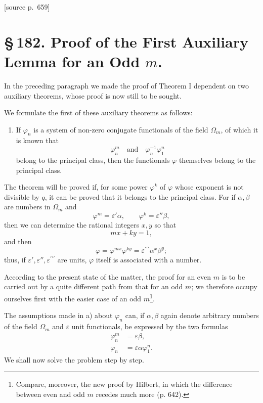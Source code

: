 \documentclass[11pt]{article}
\newcommand{\srcpage}[1]{\par\medskip\noindent\textsf{[source p.~#1]}\par\smallskip}
\begin{document}
\srcpage{659}
\section*{\S\,182. Proof of the First Auxiliary Lemma for an Odd $m$.}

In the preceding paragraph we made the proof of Theorem I dependent on two auxiliary theorems, whose proof is now still to be sought.

We formulate the first of these auxiliary theorems as follows:

\begin{enumerate}[label=\alph*),leftmargin=2.2em]
\item If $\varphi_n$ is a system of non-zero conjugate functionals of the field $\Omega_m$, of which it is known that
\[
\varphi_n^m\quad\text{and}\quad\varphi_n^{-1}\varphi_1^n
\]
belong to the principal class, then the functionals $\varphi$ themselves belong to the principal class.
\end{enumerate}

The theorem will be proved if, for some power $\varphi^k$ of $\varphi$ whose exponent is not divisible by $q$, it can be proved that it belongs to the principal class. For if $\alpha,\beta$ are numbers in $\Omega_m$ and
\[
\varphi^m=\varepsilon'\alpha,
\qquad
\varphi^k=\varepsilon''\beta,
\]
then we can determine the rational integers $x,y$ so that
\[
mx+ky=1,
\]
and then
\[
\varphi=\varphi^{mx}\varphi^{ky}=\varepsilon^{\prime\prime\prime}\alpha^x\beta^y;
\]
thus, if $\varepsilon',\varepsilon'',\varepsilon^{\prime\prime\prime}$ are units, $\varphi$ itself is associated with a number.

According to the present state of the matter, the proof for an even $m$ is to be carried out by a quite different path from that for an odd $m$; we therefore occupy ourselves first with the easier case of an odd $m$\footnote{Compare, moreover, the new proof by Hilbert, in which the difference between even and odd $m$ recedes much more (p. 642).}.

The assumptions made in a) about $\varphi_n$ can, if $\alpha,\beta$ again denote arbitrary numbers of the field $\Omega_m$ and $\varepsilon$ unit functionals, be expressed by the two formulas
\begin{align}
\varphi_n^m&=\varepsilon\beta, \tag{1}\\
\varphi_n&=\varepsilon\alpha\varphi_1^n. \tag{2}
\end{align}
We shall now solve the problem step by step.
\end{document}
